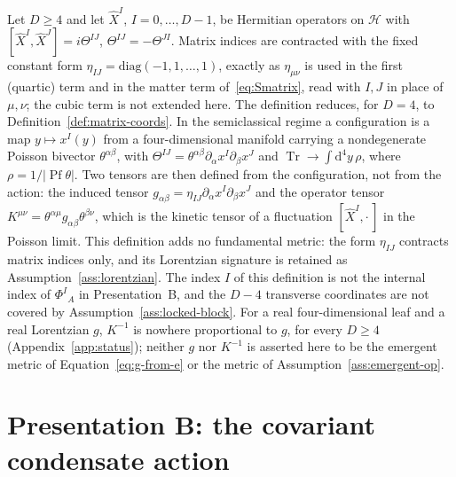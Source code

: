 \begin{definition}
  \label{def:matrix-coords-ext}
  Let \(D\ge4\) and let \(\hat X^I\), \(I=0,\dots,D-1\), be Hermitian
  operators on \(\mathcal{H}\) with
  \([\hat X^I,\hat X^J]=i\Theta^{IJ}\), \(\Theta^{IJ}=-\Theta^{JI}\).
  Matrix indices are contracted with the fixed constant form
  \(\eta_{IJ}=\mathrm{diag}(-1,1,\dots,1)\), exactly as \(\eta_{\mu\nu}\)
  is used in the first (quartic) term and in the matter term
  of~\eqref{eq:Smatrix}, read with \(I,J\) in place of \(\mu,\nu\); the
  cubic term is not extended here. The definition reduces, for \(D=4\),
  to Definition~\ref{def:matrix-coords}.
  In the semiclassical regime a configuration is a map \(y\mapsto x^I(y)\)
  from a four-dimensional manifold carrying a nondegenerate Poisson
  bivector \(\theta^{\alpha\beta}\), with
  \(\Theta^{IJ}=\theta^{\alpha\beta}\partial_\alpha x^I\partial_\beta x^J\)
  and \(\operatorname{Tr}\to\int\mathrm{d}^4y\,\rho\), where
  \(\rho=1/|\operatorname{Pf}\theta|\). Two tensors are
  then defined from the configuration, not from the action: the induced
  tensor \(g_{\alpha\beta}=\eta_{IJ}\partial_\alpha x^I\partial_\beta x^J\)
  and the operator tensor
  \(K^{\mu\nu}=\theta^{\alpha\mu}g_{\alpha\beta}\theta^{\beta\nu}\), which
  is the kinetic tensor of a fluctuation \([\hat X^I,\cdot\,]\) in the
  Poisson limit. This definition adds no fundamental metric: the form
  \(\eta_{IJ}\) contracts matrix indices only, and its Lorentzian
  signature is retained as Assumption~\ref{ass:lorentzian}. The index
  \(I\) of this definition is not the internal index of \(\Phi^I{}_A\)
  in Presentation~B, and the \(D-4\) transverse coordinates are not
  covered by Assumption~\ref{ass:locked-block}. For a real
  four-dimensional leaf and a real Lorentzian \(g\), \(K^{-1}\) is
  nowhere proportional to \(g\), for every \(D\ge4\)
  (Appendix~\ref{app:status}); neither \(g\) nor \(K^{-1}\) is asserted
  here to be the emergent metric of Equation~\eqref{eq:g-from-e} or the
  metric of Assumption~\ref{ass:emergent-op}.
\end{definition}

\section{Presentation B: the covariant condensate action}
\label{sec:ch3-Phi-action}

